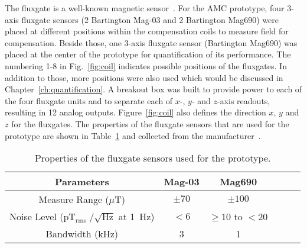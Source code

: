       

The fluxgate is a well-known magnetic sensor~\cite{flux1,flux_sense}. For the AMC prototype, four 3-axis fluxgate sensors (2 Bartington Mag-03 and 2 Bartington Mag690) were placed at different positions within the compensation coils to measure field for compensation. Beside those, one 3-axis fluxgate sensor (Bartington Mag690) was placed at the center of the prototype for quantification of its performance. The numbering 1-8 in Fig.~\ref{fig:coil} indicates possible positions of the fluxgates. In addition to those, more positions were also used which would be discussed in Chapter~\ref{ch:quantification}. A breakout box was built to provide power to each of the four fluxgate units and to separate each of $x$-, $y$- and $z$-axis readouts, resulting in 12 analog outputs. Figure~\ref{fig:coil} also defines the direction $x$, $y$ and $z$ for the fluxgates. The properties of the fluxgate sensors that are used for the prototype are shown in Table~\ref{table:sensor} and collected from the manufacturer~\cite{flux}. 

\begin{table} [!htb]
    \centering
    \begin{tabular} { |c|c|c|c|c|c|} 
        \hline
        Parameters & Mag-03 & Mag690 \\
        \hline\hline
        Measure Range ($\mu$T) & $\pm70$ & $\pm100$ \\ 
        \hline
        \makecell{Noise Level \\($\mathrm{pT_{rms}\;/\sqrt{Hz}}$ at 1~Hz)} & $<6$ & $\geq10$ to $<20$ \\ 
        \hline
        Bandwidth (kHz) & 3 & 1 \\ 
        \hline

    \end{tabular}
    \caption{Properties of the fluxgate sensors used for the prototype.}\label{table:sensor}
\end{table}

